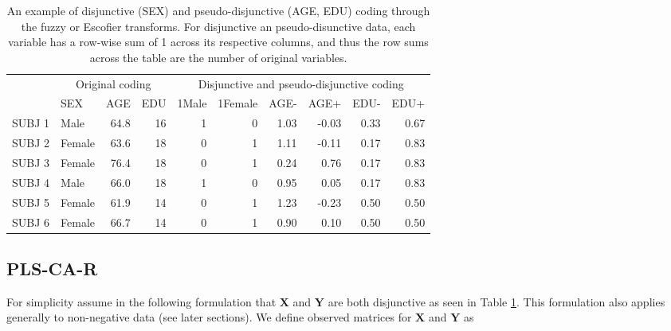\documentclass[12pt]{article}
\begin{document}
\begin{table}[!h]

\caption{\label{tab:unnamed-chunk-1}\label{table:disj} An example of disjunctive (SEX) and pseudo-disjunctive (AGE, EDU) coding through the fuzzy or Escofier transforms. For disjunctive an pseudo-disunctive data, each variable has a row-wise sum of 1 across its respective columns, and thus the row sums across the table are the number of original variables.}
\centering
\begin{tabular}{llrrrrrrrr}
\toprule
\multicolumn{1}{c}{ } & \multicolumn{3}{c}{Original coding} & \multicolumn{6}{c}{Disjunctive and pseudo-disjunctive coding} \\
\cmidrule(l{2pt}r{2pt}){2-4} \cmidrule(l{2pt}r{2pt}){5-10}
  & SEX & AGE & EDU & 1Male & 1Female & AGE- & AGE+ & EDU- & EDU+\\
\midrule
SUBJ 1 & Male & 64.8 & 16 & 1 & 0 & 1.03 & -0.03 & 0.33 & 0.67\\
SUBJ 2 & Female & 63.6 & 18 & 0 & 1 & 1.11 & -0.11 & 0.17 & 0.83\\
SUBJ 3 & Female & 76.4 & 18 & 0 & 1 & 0.24 & 0.76 & 0.17 & 0.83\\
SUBJ 4 & Male & 66.0 & 18 & 1 & 0 & 0.95 & 0.05 & 0.17 & 0.83\\
SUBJ 5 & Female & 61.9 & 14 & 0 & 1 & 1.23 & -0.23 & 0.50 & 0.50\\
\addlinespace
SUBJ 6 & Female & 66.7 & 14 & 0 & 1 & 0.90 & 0.10 & 0.50 & 0.50\\
\bottomrule
\end{tabular}
\end{table}

\hypertarget{pls-ca-r}{%
\subsection{PLS-CA-R}\label{pls-ca-r}}

\label{section:plscar_form}

For simplicity assume in the following formulation that \({\mathbf X}\)
and \({\mathbf Y}\) are both disjunctive as seen in Table
\ref{table:disj}. This formulation also applies generally to
non-negative data (see later sections). We define observed matrices for
\({\mathbf X}\) and \({\mathbf Y}\) as
\end{document}
